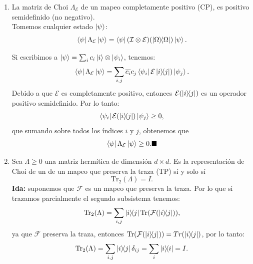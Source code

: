 \documentclass[letterpaper,12pt]{thesisECFM}
\theoremstyle{plain}
\theoremstyle{definition}
\theoremstyle{definition}
\theoremstyle{remark}
\newcommand{\1}{\mathbb{1}}
\begin{document}
\begin{enumerate}
        
    \item La matriz de Choi $\Lambda_{\mathcal{E}}$ de un mapeo completamente positivo (CP), es positivo semidefinido (no negativo).\\ 
     Tomemos cualquier estado $\ket{\psi}$:
    \begin{equation}
    \bra{\psi} \Lambda_{\mathcal{E}} \ket{\psi} = \bra{\psi} (\mathcal{I} \otimes \mathcal{E})(\ketbra{\Omega}) \ket{\psi}.
    \end{equation}
    
    Si escribimos a $\ket{\psi} = \sum_i c_i \ket{i} \otimes \ket{\psi_i}$, tenemos:
    \begin{equation}
    \bra{\psi} \Lambda_{\mathcal{E}} \ket{\psi} = \sum_{i, j} \overline{c_i} c_j \bra{\psi_i} \mathcal{E}\ketbra{i}{j}) \ket{\psi_j}.
    \end{equation}
    Debido a que $\mathcal{E}$ es completamente positivo, entonces $\mathcal{E}(\ketbra{i}{j})$ es un operador positivo semidefinido. Por lo tanto: 
    \begin{equation}
    \bra{\psi_i} \mathcal{E}(\ketbra{i}{j}) \ket{\psi_j} \geq 0,
    \end{equation}
    que sumando sobre todos los índices $i$ y $j$, obtenemos que
    \begin{equation}
    \bra{\psi} \Lambda_{\mathcal{E}} \ket{\psi} \geq 0. \blacksquare
    \end{equation}
    \item Sea $\Lambda \geq0$ una matriz hermítica de dimensión $d \times d$. Es la representación de Choi de un de un mapeo que preserva la traza (TP) sí y solo sí 
    \begin{equation}
        \text{Tr}_2 (\Lambda) = I.
    \end{equation}
    \textbf{Ida:} suponemos que $\mathcal{F}$ es un mapeo que preserva la traza. Por lo que si trazamos parcialmente el segundo subsistema tenemos:
    \begin{equation}
        \text{Tr}_2(\Lambda) = \sum_{i, j}\ketbra{i}{j}\text{Tr}(\mathcal{F}(\ketbra{i}{j})),
    \end{equation}
    ya que $\mathcal{F}$ preserva la traza, entonces $\text{Tr}(\mathcal{F}(\ketbra{i}{j})) = Tr(\ketbra{i}{j})$, por lo tanto:
    \begin{equation}
         \text{Tr}_2(\Lambda) = \sum_{i, j}\ketbra{i}{j} \delta_{ij}= \sum_i \ketbra{i}= I. 
    \end{equation}
    

\end{enumerate}
\end{document}
